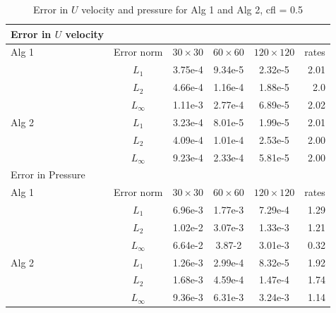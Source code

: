 \begin{table}[H]
  \begin{center}
    \begin{tabular}{| l | c | c c c | r |}
    \hline
    Error in $U$ velocity \\
    \hline
    Alg 1 & Error norm & $30 \times 30$ & $60 \times 60$ & $120 \times 120$ & rates \\
     & $L_1$ & 3.75e-4 & 9.34e-5 & 2.32e-5 & 2.01 \\
     & $L_2$ & 4.66e-4 & 1.16e-4 & 1.88e-5 & 2.0 \\
     & $L_\infty$ & 1.11e-3 & 2.77e-4 & 6.89e-5 & 2.02\\
    \hline
    Alg 2
     & $L_1$ & 3.23e-4 & 8.01e-5 & 1.99e-5 & 2.01 \\
     & $L_2$ & 4.09e-4 & 1.01e-4 & 2.53e-5 & 2.00 \\
     & $L_\infty$ & 9.23e-4 & 2.33e-4 & 5.81e-5 & 2.00\\
    \hline
    \hline
    Error in Pressure\\
    \hline
    Alg 1 & Error norm & $30 \times 30$ & $60 \times 60$ & $120 \times 120$ & rates \\
     & $L_1$ & 6.96e-3 & 1.77e-3 & 7.29e-4 & 1.29 \\
     & $L_2$ & 1.02e-2 & 3.07e-3 & 1.33e-3 & 1.21 \\
     & $L_\infty$ & 6.64e-2 & 3.87-2 & 3.01e-3 & 0.32\\
    \hline
    Alg 2
     & $L_1$ & 1.26e-3 & 2.99e-4 & 8.32e-5 & 1.92 \\
     & $L_2$ & 1.68e-3 & 4.59e-4 & 1.47e-4 & 1.74 \\
     & $L_\infty$ & 9.36e-3 & 6.31e-3 & 3.24e-3 & 1.14\\
	\hline
    \end{tabular}
  \end{center}
  \caption{Error in $U$ velocity and pressure for Alg 1 and Alg 2, cfl = 0.5}
\end{table}

